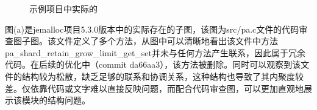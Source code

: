 \begin{figure}[!h]
    \setlength{\subfigcapskip}{-1bp}
    \centering
    \begin{minipage}{\textwidth}
    \centering
    \hspace{2em}
    \end{minipage}
    \centering
    \begin{minipage}{\textwidth}
    \centering
    \hspace{2em}
    \end{minipage}
    \vspace{0.2em}
    \caption{示例项目中实际的} %
\end{figure}



图(a)是jemalloc项目5.3.0版本中的实际存在的子图，该图为src/pa.c文件的代码审查图子图。该文件定义了多个方法，从图中可以清晰地看出该文件中方法pa\_shard\_retain\_grow\_limit\_get\_set并未与任何方法产生联系，因此属于冗余代码。在后续的优化中（commit da66aa3），该方法被删除。同时可以观察到该文件的结构较为松散，缺乏足够的联系和协调关系，这种结构也导致了其内聚度较差。仅依靠代码或文字难以直接反映问题，而配合代码审查图，可以更加直观地展示该模块的结构问题。

